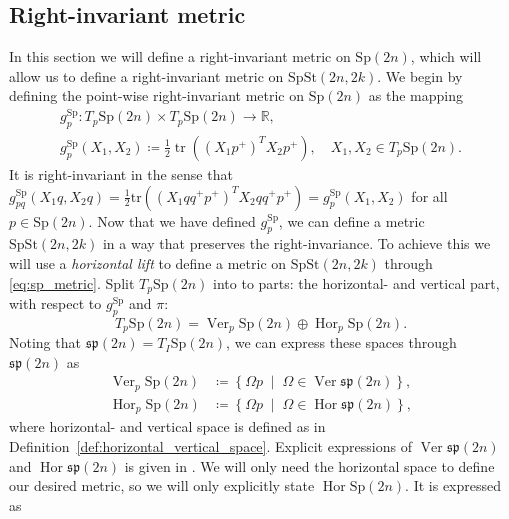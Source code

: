 \subsection{Right-invariant metric}
In this section we will define a right-invariant metric on $\mathrm{Sp}(2n)$, which will allow us to define a right-invariant metric on $\mathrm{SpSt}(2n, 2k)$. We begin by defining the point-wise right-invariant metric on $\mathrm{Sp}(2n)$ as the mapping 
\begin{equation}\label{eq:sp_metric}
    \begin{gathered}
        g_{p}^{\mathrm{Sp}}\colon T_{p}\mathrm{Sp}(2n)\times T_{p}\mathrm{Sp}(2n)\xrightarrow{}\mathbb{R},\\
        g_{p}^{\mathrm{Sp}}(X_{1},X_{2})\coloneqq\frac{1}{2}\operatorname{tr}((X_{1}p^{+})^{T}X_{2}p^{+}),\quad X_{1},X_{2}\in T_{p}\mathrm{Sp}(2n).
    \end{gathered}
\end{equation}
It is right-invariant in the sense that
$g_{pq}^{\mathrm{Sp}}(X_{1}q,X_{2}q)=\tfrac{1}{2}\mathrm{tr}((X_{1}qq^{+}p^{+})^{T}X_{2}qq^{+}p^{+})=g_{p}^{\mathrm{Sp}}(X_{1},X_{2})$ for all $p\in \mathrm{Sp}(2n)$.
Now that we have defined $g_{p}^{\mathrm{Sp}}$, we can define a metric $\mathrm{SpSt}(2n, 2k)$ in a way that preserves the right-invariance. To achieve this we will use a \textit{horizontal lift} to define a metric on $\mathrm{SpSt}(2n, 2k)$ through \eqref{eq:sp_metric}. Split $T_{p}\mathrm{Sp}(2n)$ into to parts: the horizontal- and vertical part, with respect to $g^\mathrm{Sp}_{p}$ and $\pi$: 
\begin{equation}\label{eq:spst_split}
    T_{p}\mathrm{Sp}(2n)=\operatorname{Ver}_{p}\mathrm{Sp}(2n)\oplus \operatorname{Hor}_{p}\mathrm{Sp}(2n).
\end{equation}
%
Noting that $\mathfrak{sp}(2n)=T_{I}\mathrm{Sp}(2n)$, we can express these spaces through $\mathfrak{sp}(2n)$ as
%
\begin{align*}
\operatorname{Ver}_{p}\mathrm{Sp}(2n)&\coloneqq\left\{ \Omega p\;\middle|\;\Omega \in \operatorname{Ver}\mathfrak{sp}(2n) \right\}, \\
\operatorname{Hor}_{p}\mathrm{Sp}(2n)&\coloneqq\left\{ \Omega p\;\middle|\;\Omega \in \operatorname{Hor}\mathfrak{sp}(2n) \right\},
\end{align*}
%
where horizontal- and vertical space is defined as in Definition~\ref{def:horizontal_vertical_space}. Explicit expressions of $\operatorname{Ver}\mathfrak{sp}(2n)$ and $\operatorname{Hor}\mathfrak{sp}(2n)$ is given in \cite[p.~11]{BendokatZimmermann2021}. We will only need the horizontal space to define our desired metric, so we will only explicitly state $\operatorname{Hor}\mathrm{Sp}(2n)$. It is expressed as
